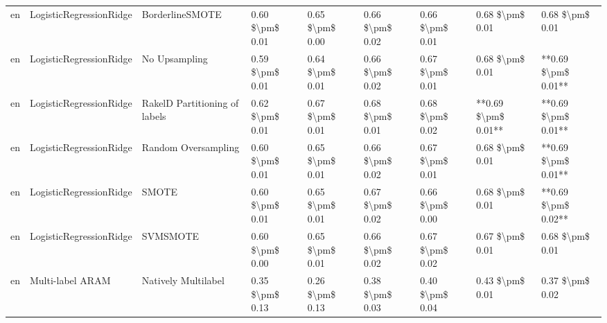 \begin{tabular}{lllllllll}
      en &         LogisticRegressionRidge &               BorderlineSMOTE & 0.60 \$\textbackslash pm\$ 0.01 &           0.65 \$\textbackslash pm\$ 0.00 &       0.66 \$\textbackslash pm\$ 0.02 &        0.66 \$\textbackslash pm\$ 0.01 &                         0.68 \$\textbackslash pm\$ 0.01 &     0.68 \$\textbackslash pm\$ 0.01 \\
      en &         LogisticRegressionRidge &                 No Upsampling & 0.59 \$\textbackslash pm\$ 0.01 &           0.64 \$\textbackslash pm\$ 0.01 &       0.66 \$\textbackslash pm\$ 0.02 &        0.67 \$\textbackslash pm\$ 0.01 &                         0.68 \$\textbackslash pm\$ 0.01 & **0.69 \$\textbackslash pm\$ 0.01** \\
      en &         LogisticRegressionRidge & RakelD Partitioning of labels & 0.62 \$\textbackslash pm\$ 0.01 &           0.67 \$\textbackslash pm\$ 0.01 &       0.68 \$\textbackslash pm\$ 0.01 &        0.68 \$\textbackslash pm\$ 0.02 &                     **0.69 \$\textbackslash pm\$ 0.01** & **0.69 \$\textbackslash pm\$ 0.01** \\
      en &         LogisticRegressionRidge &           Random Oversampling & 0.60 \$\textbackslash pm\$ 0.01 &           0.65 \$\textbackslash pm\$ 0.01 &       0.66 \$\textbackslash pm\$ 0.02 &        0.67 \$\textbackslash pm\$ 0.01 &                         0.68 \$\textbackslash pm\$ 0.01 & **0.69 \$\textbackslash pm\$ 0.01** \\
      en &         LogisticRegressionRidge &                         SMOTE & 0.60 \$\textbackslash pm\$ 0.01 &           0.65 \$\textbackslash pm\$ 0.01 &       0.67 \$\textbackslash pm\$ 0.02 &        0.66 \$\textbackslash pm\$ 0.00 &                         0.68 \$\textbackslash pm\$ 0.01 & **0.69 \$\textbackslash pm\$ 0.02** \\
      en &         LogisticRegressionRidge &                      SVMSMOTE & 0.60 \$\textbackslash pm\$ 0.00 &           0.65 \$\textbackslash pm\$ 0.01 &       0.66 \$\textbackslash pm\$ 0.02 &        0.67 \$\textbackslash pm\$ 0.02 &                         0.67 \$\textbackslash pm\$ 0.01 &     0.68 \$\textbackslash pm\$ 0.01 \\
      en &                Multi-label ARAM &           Natively Multilabel & 0.35 \$\textbackslash pm\$ 0.13 &           0.26 \$\textbackslash pm\$ 0.13 &       0.38 \$\textbackslash pm\$ 0.03 &        0.40 \$\textbackslash pm\$ 0.04 &                         0.43 \$\textbackslash pm\$ 0.01 &     0.37 \$\textbackslash pm\$ 0.02 \\

\end{tabular}
